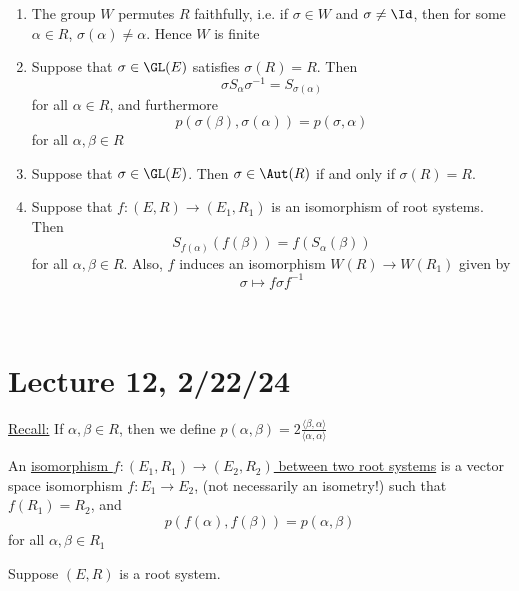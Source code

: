 \documentclass[x11names,reqno,14pt]{extarticle}
\begin{document}
\begin{enumerate}[label=(\alph*)]

\item The group $W$ permutes $R$ faithfully, i.e. if $\sigma\in W$ and $\sigma\neq\Id$, then for some $\alpha \in R$, $\sigma(\alpha)\neq\alpha$. Hence $W$ is finite

\item Suppose that $\sigma\in\GL(E)$ satisfies $\sigma(R) = R$. Then 
\[
\sigma S_\alpha\sigma^{-1} = S_{\sigma(\alpha)}
\]
for all $\alpha\in R$, and furthermore 
\[
p(\sigma(\beta),\sigma(\alpha)) = p(\sigma,\alpha)
\]
for all $\alpha,\beta\in R$

\item Suppose that $\sigma\in\GL(E)$. Then $\sigma\in\Aut(R)$ if and only if $\sigma(R) = R$. 

\item Suppose that $f:(E,R)\to(E_1,R_1)$ is an isomorphism of root systems. Then
\[
S_{f(\alpha)}(f(\beta))  = f(S_{\alpha}(\beta))
\]
for all $\alpha,\beta\in R$. Also, $f$ induces an isomorphism $W(R)\to W(R_1)$ given by 
\[
\sigma\mapsto f\sigma f^{-1}
\]

\end{enumerate}

\proof\,

\section*{Lecture 12, 2/22/24}



\underline{Recall:} If $\alpha,\beta\in R$, then we define $p(\alpha,\beta) = 2\frac{\langle\beta,\alpha\rangle}{\langle\alpha,\alpha\rangle}$



An \underline{isomorphism $f:(E_1,R_1)\to(E_2,R_2)$ between two root systems}
is a vector space isomorphism $f:E_1\to E_2$, (not necessarily an isometry!) such that $f(R_1) = R_2$, and 
\[
p(f(\alpha),f(\beta)) = p(\alpha,\beta)
\]
for all $\alpha,\beta\in R_1$

\prop

Suppose $(E,R)$ is a root system. 
\end{document}
